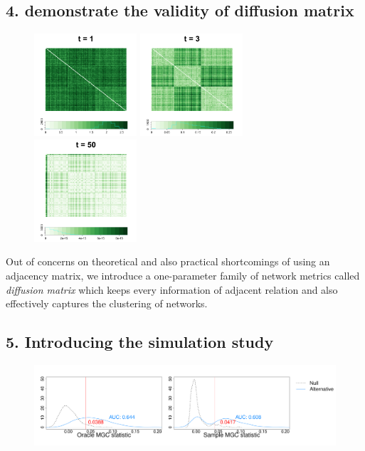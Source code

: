 \documentclass[12pt]{article}
\begin{document}
\subsection*{4. demonstrate the validity of diffusion matrix } 

\begin{figure}[H]
	\centering
	\includegraphics[width=1.5in]{../Figure/Dx1.png}
	\includegraphics[width=1.5in]{../Figure/Dx3.png}
	\includegraphics[width=1.5in]{../Figure/Dx50.png}
	\label{fig:diffusions}
\end{figure}	

Out of concerns on theoretical and also practical shortcomings of using an adjacency matrix, we introduce a one-parameter family of network metrics called \textit{diffusion matrix} which keeps every information of adjacent relation and also effectively captures the clustering of networks. 

\subsection*{5. Introducing the simulation study}

\begin{figure}[H]
	\centering
	\includegraphics[width=6in]{../Figure/density.pdf}
	\label{fig:density}
\end{figure}	
 
\end{document}
